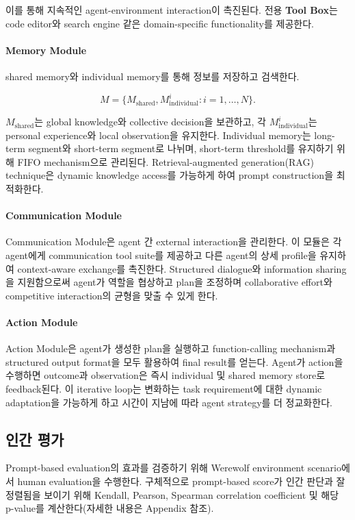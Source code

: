 이를 통해 지속적인 agent-environment interaction이 촉진된다. 전용 \textbf{Tool Box}는 code editor와 search engine 같은 domain-specific functionality를 제공한다.

\paragraph{Memory Module}
shared memory와 individual memory를 통해 정보를 저장하고 검색한다.

\[
M = \{M_{\text{shared}}, M_{\text{individual}}^i : i = 1, \dots, N\}.
\]

$M_{\text{shared}}$는 global knowledge와 collective decision을 보관하고, 각 $M_{\text{individual}}^i$는 personal experience와 local observation을 유지한다. Individual memory는 long-term segment와 short-term segment로 나뉘며, short-term threshold를 유지하기 위해 FIFO mechanism으로 관리된다. Retrieval-augmented generation(RAG) technique은 dynamic knowledge access를 가능하게 하여 prompt construction을 최적화한다.

\paragraph{Communication Module}
Communication Module은 agent 간 external interaction을 관리한다. 이 모듈은 각 agent에게 communication tool suite를 제공하고 다른 agent의 상세 profile을 유지하여 context-aware exchange를 촉진한다. Structured dialogue와 information sharing을 지원함으로써 agent가 역할을 협상하고 plan을 조정하며 collaborative effort와 competitive interaction의 균형을 맞출 수 있게 한다.

\paragraph{Action Module}
Action Module은 agent가 생성한 plan을 실행하고 function-calling mechanism과 structured output format을 모두 활용하여 final result를 얻는다. Agent가 action을 수행하면 outcome과 observation은 즉시 individual 및 shared memory store로 feedback된다. 이 iterative loop는 변화하는 task requirement에 대한 dynamic adaptation을 가능하게 하고 시간이 지남에 따라 agent strategy를 더 정교화한다.


\subsection{인간 평가}
\label{app:human-evaluation}

Prompt-based evaluation의 효과를 검증하기 위해 Werewolf environment scenario에서 human evaluation을 수행한다. 구체적으로 prompt-based score가 인간 판단과 잘 정렬됨을 보이기 위해 Kendall, Pearson, Spearman correlation coefficient 및 해당 p-value를 계산한다(자세한 내용은 Appendix 참조).

